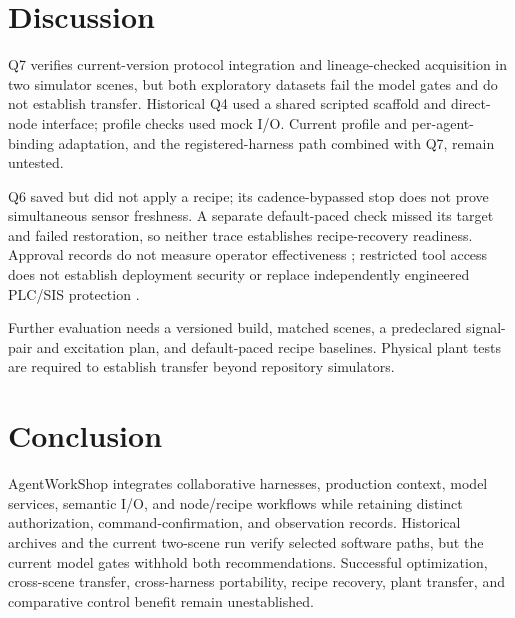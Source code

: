 \section{Discussion}
\label{sec:limits}
Q7 verifies current-version protocol integration and lineage-checked
acquisition in two simulator scenes, but both exploratory datasets fail the
model gates and do not establish transfer. Historical Q4 used a shared
scripted scaffold and direct-node interface; profile checks used mock I/O.
Current profile and per-agent-binding adaptation, and the registered-harness
path combined with Q7, remain untested.

Q6 saved but did not apply a recipe; its cadence-bypassed stop does not prove
simultaneous sensor freshness. A separate default-paced check missed its
target and failed restoration, so neither trace establishes recipe-recovery
readiness. Approval records do not measure operator effectiveness
\cite{parasuramanmanzey2010complacency,parasuraman2000model,bainbridge1983ironies};
restricted tool access does not establish deployment security
\cite{greshake2023injection,liu2024pinjection,iec62443-3-3} or replace
independently engineered PLC/SIS protection \cite{iec61511}.

Further evaluation needs a versioned build, matched scenes, a predeclared
signal-pair and excitation plan, and default-paced recipe baselines. Physical
plant tests are required to establish transfer beyond repository simulators.

\section{Conclusion}
\label{sec:conclusion}
AgentWorkShop integrates collaborative harnesses, production context, model
services, semantic I/O, and node/recipe workflows while retaining distinct
authorization, command-confirmation, and observation records. Historical
archives and the current two-scene run verify selected software paths, but
the current model gates withhold both recommendations. Successful
optimization, cross-scene transfer, cross-harness portability, recipe
recovery, plant transfer, and comparative control benefit remain unestablished.
